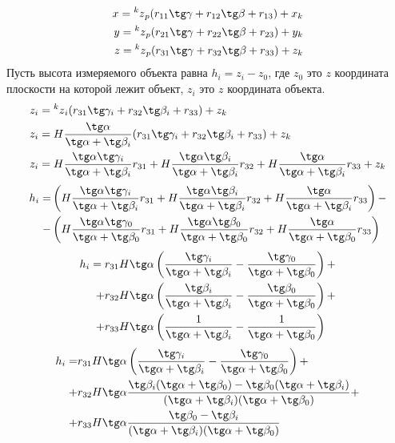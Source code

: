 \documentclass[a4paper, 12pt]{article}
\begin{document}
    \[
        \begin{split}
            x = \prescript{k}{}{z}_p(r_{11}\tg\gamma + r_{12}\tg\beta + r_{13}) + x_k\\
            y = \prescript{k}{}{z}_p(r_{21}\tg\gamma + r_{22}\tg\beta + r_{23}) + y_k\\
            z = \prescript{k}{}{z}_p(r_{31}\tg\gamma + r_{32}\tg\beta + r_{33}) + z_k\\
        \end{split}
    \]
    Пусть высота измеряемого объекта равна $h_i = z_i - z_0$, где $z_0$ это $z$ координата плоскости на которой лежит объект, $z_i$ это $z$ координата объекта.
    \[
        \begin{split}
            z_i &= \prescript{k}{}{z}_i(r_{31}\tg\gamma_i + r_{32}\tg\beta_i + r_{33}) + z_k\\
            z_i &= H\frac{\tg\alpha}{\tg\alpha+\tg\beta_i}(r_{31}\tg\gamma_i + r_{32}\tg\beta_i + r_{33}) + z_k\\
            z_i &= H\frac{\tg\alpha\tg\gamma_i}{\tg\alpha+\tg\beta_i}r_{31} + H\frac{\tg\alpha\tg\beta_i}{\tg\alpha+\tg\beta_i}r_{32} + H\frac{\tg\alpha}{\tg\alpha+\tg\beta_i}r_{33} + z_k
        \end{split}
    \]
    \[
        \begin{split}
            h_i = &\left(H\frac{\tg\alpha\tg\gamma_i}{\tg\alpha+\tg\beta_i}r_{31} + H\frac{\tg\alpha\tg\beta_i}{\tg\alpha+\tg\beta_i}r_{32} + H\frac{\tg\alpha}{\tg\alpha+\tg\beta_i}r_{33}\right)-\\
            - &\left(H\frac{\tg\alpha\tg\gamma_0}{\tg\alpha+\tg\beta_0}r_{31} + H\frac{\tg\alpha\tg\beta_0}{\tg\alpha+\tg\beta_0}r_{32} + H\frac{\tg\alpha}{\tg\alpha+\tg\beta_0}r_{33}\right)
        \end{split}
    \]
    \[
        \begin{aligned}
            h_i = r_{31} H \tg\alpha &\left(\frac{\tg\gamma_i}{\tg\alpha+\tg\beta_i} - \frac{\tg\gamma_0}{\tg\alpha+\tg\beta_0}\right)+\\
            + r_{32} H \tg\alpha &\left(\frac{\tg\beta_i}{\tg\alpha+\tg\beta_i} - \frac{\tg\beta_0}{\tg\alpha+\tg\beta_0}\right)+\\
            + r_{33} H \tg\alpha &\left(\frac{1}{\tg\alpha+\tg\beta_i} - \frac{1}{\tg\alpha+\tg\beta_0}\right)
        \end{aligned}
    \]
    \[
        \begin{aligned}
            h_i = &r_{31} H \tg\alpha \left(\frac{\tg\gamma_i}{\tg\alpha+\tg\beta_i} - \frac{\tg\gamma_0}{\tg\alpha+\tg\beta_0}\right)+\\
            + &r_{32} H \tg\alpha \frac{\tg\beta_i(\tg\alpha+\tg\beta_0)-\tg\beta_0(\tg\alpha+\tg\beta_i)}{(\tg\alpha+\tg\beta_i)(\tg\alpha+\tg\beta_0)}+\\
            + &r_{33} H \tg\alpha \frac{\tg\beta_0 - \tg\beta_i}{(\tg\alpha+\tg\beta_i)(\tg\alpha+\tg\beta_0)}
        \end{aligned}
    \]
\end{document}
